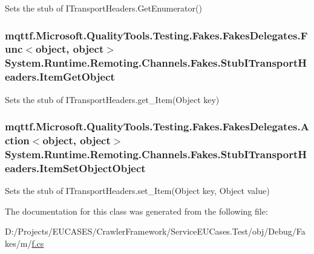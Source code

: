 Sets the stub of I\-Transport\-Headers.\-Get\-Enumerator()

\hypertarget{class_system_1_1_runtime_1_1_remoting_1_1_channels_1_1_fakes_1_1_stub_i_transport_headers_ae9928f33e6d43bea9661b5ac8b3804b0}{
\subsubsection[{Item\-Get\-Object}]{\setlength{\rightskip}{0pt plus 5cm}mqttf.\-Microsoft.\-Quality\-Tools.\-Testing.\-Fakes.\-Fakes\-Delegates.\-Func$<$object, object$>$ System.\-Runtime.\-Remoting.\-Channels.\-Fakes.\-Stub\-I\-Transport\-Headers.\-Item\-Get\-Object}}\label{class_system_1_1_runtime_1_1_remoting_1_1_channels_1_1_fakes_1_1_stub_i_transport_headers_ae9928f33e6d43bea9661b5ac8b3804b0}


Sets the stub of I\-Transport\-Headers.\-get\-\_\-\-Item(\-Object key)

\hypertarget{class_system_1_1_runtime_1_1_remoting_1_1_channels_1_1_fakes_1_1_stub_i_transport_headers_a05209b3858e8f172e3ae70f143d9740f}{
\subsubsection[{Item\-Set\-Object\-Object}]{\setlength{\rightskip}{0pt plus 5cm}mqttf.\-Microsoft.\-Quality\-Tools.\-Testing.\-Fakes.\-Fakes\-Delegates.\-Action$<$object, object$>$ System.\-Runtime.\-Remoting.\-Channels.\-Fakes.\-Stub\-I\-Transport\-Headers.\-Item\-Set\-Object\-Object}}\label{class_system_1_1_runtime_1_1_remoting_1_1_channels_1_1_fakes_1_1_stub_i_transport_headers_a05209b3858e8f172e3ae70f143d9740f}


Sets the stub of I\-Transport\-Headers.\-set\-\_\-\-Item(\-Object key, Object value)



The documentation for this class was generated from the following file\-:\begin{DoxyCompactItemize}
\item 
D\-:/\-Projects/\-E\-U\-C\-A\-S\-E\-S/\-Crawler\-Framework/\-Service\-E\-U\-Cases.\-Test/obj/\-Debug/\-Fakes/m/\hyperlink{m_2f_8cs}{f.\-cs}\end{DoxyCompactItemize}
